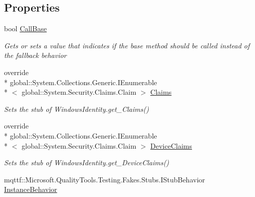 \subsection*{Properties}
\begin{DoxyCompactItemize}
\item 
bool \hyperlink{class_system_1_1_security_1_1_principal_1_1_fakes_1_1_stub_windows_identity_a4af2932413b1a079df237ef4e213cf8f}{Call\-Base}
\begin{DoxyCompactList}\small\item\em Gets or sets a value that indicates if the base method should be called instead of the fallback behavior\end{DoxyCompactList}\item 
override \\*
global\-::\-System.\-Collections.\-Generic.\-I\-Enumerable\\*
$<$ global\-::\-System.\-Security.\-Claims.\-Claim $>$ \hyperlink{class_system_1_1_security_1_1_principal_1_1_fakes_1_1_stub_windows_identity_aeac91a167235abeb7c2e54d0f5c497b2}{Claims}
\begin{DoxyCompactList}\small\item\em Sets the stub of Windows\-Identity.\-get\-\_\-\-Claims()\end{DoxyCompactList}\item 
override \\*
global\-::\-System.\-Collections.\-Generic.\-I\-Enumerable\\*
$<$ global\-::\-System.\-Security.\-Claims.\-Claim $>$ \hyperlink{class_system_1_1_security_1_1_principal_1_1_fakes_1_1_stub_windows_identity_a5a2bd6aa24577be9fb5af9eb1d7d1a9a}{Device\-Claims}
\begin{DoxyCompactList}\small\item\em Sets the stub of Windows\-Identity.\-get\-\_\-\-Device\-Claims()\end{DoxyCompactList}\item 
mqttf\-::\-Microsoft.\-Quality\-Tools.\-Testing.\-Fakes.\-Stubs.\-I\-Stub\-Behavior \hyperlink{class_system_1_1_security_1_1_principal_1_1_fakes_1_1_stub_windows_identity_a7de19dacdcc4e32d6e246f8e57d36729}{Instance\-Behavior}

\end{DoxyCompactItemize}
